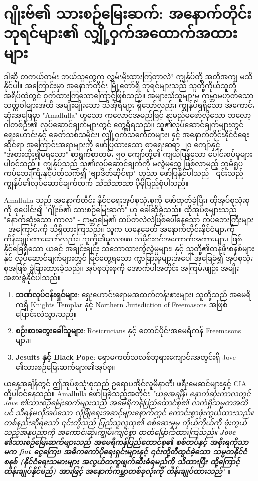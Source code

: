 \documentclass[10pt,twocolumn,letterpaper]{article}
\begin{document}
\section{ဂျိုးဗ်၏ သားစဉ်မြေးဆက်: အနောက်တိုင်း ဘုရင်များ၏ လျှို့ဝှက်အထောက်အထားများ}

ဒါဆို တကယ်တမ်း ဘယ်သူတွေက လွှမ်းမိုးထားကြတာလဲ? ကျွန်ုပ်တို့ အတိအကျ မသိနိုင်ပါ။ အကြောင်းမှာ အနောက်တိုင်း မြို့တော်ရှိ ဘုရင်များသည် သူတို့ကိုယ်သူတို့ အရိပ်ထဲတွင် ဝှက်ထားကြသောကြောင့်ဖြစ်သည်။ အများသိသူများမှ ကမ္ဘာမဟုတ်သော သတ္တဝါများအထိ အမျိုးမျိုးသော သီအိုရီများ ရှိသော်လည်း၊ ကျွန်ုပ်ရရှိသော အကောင်းဆုံးအဖြေမှာ "Amallulla" ဟူသော ကလောင်အမည်ဖြင့် နာမည်မဖော်လိုသော ဘလော့ဂါတစ်ဦး၏ လုပ်ဆောင်ချက်များတွင် တွေ့ရှိရသည်။ သူ၏လုပ်ဆောင်ချက်များတွင် ရှေးဟောင်းနှင့် ခေတ်သစ်သမိုင်း၊ လျှို့ဝှက်သင်္ကေတများ၊ နှင့် အနောက်တိုင်းနိုင်ငံရေးဆိုင်ရာ အကြောင်းအရာများကို ဖော်ပြထားသော စာရေးဆရာ ၂၀ ကျော်နှင့် "အစားထိုး၍မရသော" စာရွက်စာတမ်း ၅၀ ကျော်တို့၏ ကျယ်ပြန့်သော ပေါင်းစပ်မှုများ ပါဝင်သည် \cite{33,34}။ ကျွန်ုပ်သည် သူ၏လုပ်ဆောင်ချက်ကို မလွဲမသွေ ဖြစ်လာမည့် ဘူမိရူပ ကပ်ဘေးကြီးနှင့်ပတ်သက်၍ "ဗျာဒိတ်ဆိုင်ရာ" ဟုသာ ဖော်ပြနိုင်ပါသည် - ၎င်းသည် ကျွန်ုပ်၏လုပ်ဆောင်ချက်ထက် \textit{သိသိသာသာ} ပိုမိုပြည့်စုံပါသည်။

Amallulla သည် အနောက်တိုင်း နိုင်ငံရေးအုပ်စုသုံးစုကို ဖော်ထုတ်ခဲ့ပြီး၊ ထိုအုပ်စုသုံးစုကို စုပေါင်း၍ "ဂျိုးဗ်၏ သားစဉ်မြေးဆက်" ဟု ခေါ်ဆိုခဲ့သည်။ ထိုအုပ်စုများသည် "နောက်ဆုံးသော ကာလ" - ကမ္ဘာမြေ၏ ထပ်တလဲလဲဖြစ်ပေါ်နေသော ကပ်ဘေးကြီးများ - အကြောင်းကို သိရှိထားကြသည်။ သူက ယနေ့ခေတ် အနောက်တိုင်းနိုင်ငံများကို ထိန်းချုပ်ထားသော်လည်း၊ သူတို့၏မူလအစ၊ သမိုင်းဝင်အထောက်အထားများ၊ ဖြစ်နိုင်ခြေရှိသော ယခင် အချင်းချင်း သဘောထားကွဲလွဲမှုများ၊ နှင့် သူတို့၏တန်ဖိုးစနစ်များနှင့် လုပ်ဆောင်ချက်များတွင် မြင်တွေ့ရသော ကွာခြားမှုများအပေါ် အခြေခံ၍ အုပ်စုသုံးစုအဖြစ် ခွဲခြားထားခဲ့သည်။
အုပ်စုသုံးစုကို အောက်ပါအတိုင်း အကြမ်းဖျဉ်း အမျိုးအစားခွဲနိုင်ပါသည်။

\begin{flushleft}
\begin{enumerate}
    \item \textbf{ဘဏ်လုပ်ငန်းရှင်များ}: ရှေးဟောင်းရောမအထက်တန်းစားများ၊ သူတို့သည် အမေရိကရှိ Knights Templar နှင့် Northern Jurisdiction of Freemasons အဖြစ်ပြောင်းလဲသွားသည်။
    \item \textbf{စဉ်းစားတွေးခေါ်သူများ}: Rosicrucians နှင့် တောင်ပိုင်းအမေရိကန် Freemasons များ။
    \item \textbf{Jesuits နှင့် Black Pope}: ရောမကတ်သလစ်ဘုရားကျောင်းအတွင်းရှိ Jove ၏သားစဉ်မြေးဆက်များ၏အုပ်စု။
\end{enumerate}
\end{flushleft}
ယနေ့အချိန်တွင် ဤအုပ်စုသုံးစုသည် ဥရောပအိုင်လူမိနာတီ၊ ဖရီးမေဆင်များနှင့် CIA တို့ပါဝင်နေသည်။ Amallulla ဖော်ပြခဲ့သည့်အတိုင်း \textit{"ယခုအချိန်၊ နောက်ဆုံးကာလတွင် Jove ၏သားစဉ်မြေးဆက်များသည် အမေရိကန်ပြည်ထောင်စု၏ လက်ရှိသမ္မတအထိပင် သိရန်မလိုအပ်သော လုံခြုံရေးအဆင့်များနောက်တွင် ကောင်းစွာဖုံးကွယ်ထားသည်။ တစ်နည်းဆိုရသော် ၎င်းတို့သည် ပြည်သူလူထု၏ စစ်ဆေးမှုမှ ကိုယ်ကိုယ်ကို ဖုံးကွယ်သည့်အနုပညာကို အကောင်းဆုံးကျွမ်းကျင်စွာ တတ်မြောက်ထားကြသည်။ \textbf{Jove ၏သားစဉ်မြေးဆက်များသည် အမေရိကန်ပြည်ထောင်စု၏ စစ်တပ်နှင့် အစိုးရကိုသာမက fiat ငွေကြေး၊ အဓိကကော်ပိုရေးရှင်းများနှင့် ၎င်းတို့တီထွင်ခဲ့သော သမ္မတနိုင်ငံစနစ် (နိုင်ငံရေးသမားများ အလွယ်တကူဖျက်ဆီးခံရမည်ကို သိထားပြီး ထို့ကြောင့် ထိန်းချုပ်နိုင်မည်) အားဖြင့် အနောက်ကမ္ဘာတစ်ခုလုံးကို ထိန်းချုပ်ထားသည်}"} \cite{33,34}။
\end{document}
